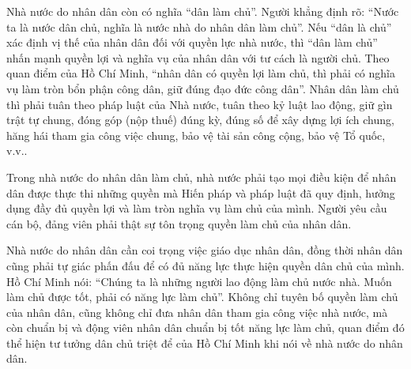 Nhà nước do nhân dân còn có nghĩa “dân làm chủ”. Người khẳng định rõ: “Nước ta là nước dân chủ, nghĩa là nước nhà do nhân dân làm chủ”. Nếu “dân là chủ” xác định vị thế của nhân dân đối với quyền lực nhà nước, thì “dân làm chủ” nhấn mạnh quyền lợi và nghĩa vụ của nhân dân với tư cách là người chủ. Theo quan điểm của Hồ Chí Minh, “nhân dân có quyền lợi làm chủ, thì phải có nghĩa vụ làm tròn bổn phận công dân, giữ đúng đạo đức công dân”. Nhân dân làm chủ thì phải tuân theo pháp luật của Nhà nước, tuân theo kỷ luật lao động, giữ gìn trật tự chung, đóng góp (nộp thuế) đúng kỳ, đúng số để xây dựng lợi ích chung, hăng hái tham gia công việc chung, bảo vệ tài sản công cộng, bảo vệ Tổ quốc, v.v..

Trong nhà nước do nhân dân làm chủ, nhà nước phải tạo mọi điều kiện để nhân dân được thực thi những quyền mà Hiến pháp và pháp luật đã quy định, hưởng dụng đầy đủ quyền lợi và làm tròn nghĩa vụ làm chủ của mình. Người yêu cầu cán bộ, đảng viên phải thật sự tôn trọng quyền làm chủ của nhân dân.

Nhà nước do nhân dân cần coi trọng việc giáo dục nhân dân, đồng thời nhân dân cũng phải tự giác phấn đấu để có đủ năng lực thực hiện quyền dân chủ của mình. Hồ Chí Minh nói: “Chúng ta là những người lao động làm chủ nước nhà. Muốn làm chủ được tốt, phải có năng lực làm chủ”. Không chỉ tuyên bố quyền làm chủ của nhân dân, cũng không chỉ đưa nhân dân tham gia công việc nhà nước, mà còn chuẩn bị và động viên nhân dân chuẩn bị tốt năng lực làm chủ, quan điểm đó thể hiện tư tưởng dân chủ triệt để của Hồ Chí Minh khi nói về nhà nước do nhân dân.

